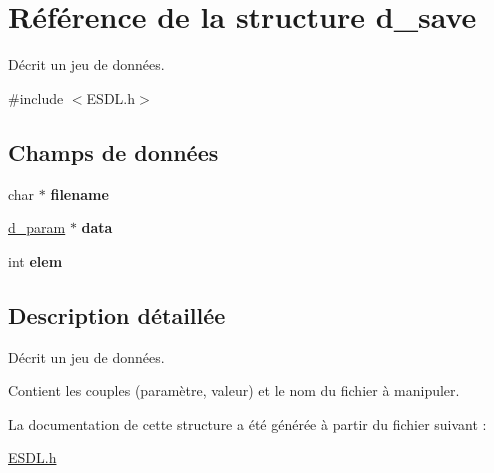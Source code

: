 \hypertarget{structd__save}{\section{Référence de la structure d\+\_\+save}
\label{structd__save}
}


Décrit un jeu de données.  




{\ttfamily \#include $<$E\+S\+D\+L.\+h$>$}

\subsection*{Champs de données}
\begin{DoxyCompactItemize}
\item 
\hypertarget{structd__save_ae6bcf87922e8b6de1c23e5b3d7ef8880}{char $\ast$ {\bfseries filename}}\label{structd__save_ae6bcf87922e8b6de1c23e5b3d7ef8880}

\item 
\hypertarget{structd__save_a1fe6434d54368fc06ba0f79a9a49b2f3}{\hyperlink{structd__param}{d\+\_\+param} $\ast$ {\bfseries data}}\label{structd__save_a1fe6434d54368fc06ba0f79a9a49b2f3}

\item 
\hypertarget{structd__save_a479286b5a8216b53445395b2ff8cb2f9}{int {\bfseries elem}}\label{structd__save_a479286b5a8216b53445395b2ff8cb2f9}

\end{DoxyCompactItemize}


\subsection{Description détaillée}
Décrit un jeu de données. 

Contient les couples (paramètre, valeur) et le nom du fichier à manipuler. 

La documentation de cette structure a été générée à partir du fichier suivant \+:\begin{DoxyCompactItemize}
\item 
\hyperlink{_e_s_d_l_8h}{E\+S\+D\+L.\+h}\end{DoxyCompactItemize}

